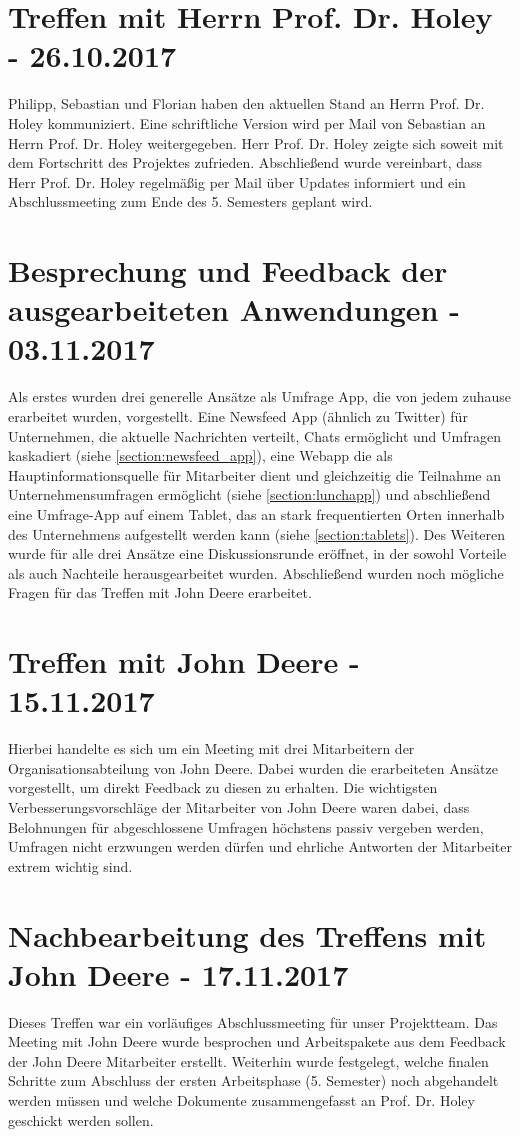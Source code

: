 \section{Treffen mit Herrn Prof. Dr. Holey - 26.10.2017}
Philipp, Sebastian und Florian haben den aktuellen Stand an Herrn Prof. Dr. Holey kommuniziert. Eine schriftliche Version wird per Mail von Sebastian an Herrn Prof. Dr. Holey weitergegeben. Herr Prof. Dr. Holey zeigte sich soweit mit dem Fortschritt des Projektes zufrieden. Abschließend wurde vereinbart, dass Herr Prof. Dr. Holey regelmäßig per Mail über Updates informiert und ein Abschlussmeeting zum Ende des 5. Semesters geplant wird.

\section{Besprechung und Feedback der ausgearbeiteten Anwendungen - 03.11.2017}
Als erstes wurden drei generelle Ansätze als Umfrage App, die von jedem zuhause erarbeitet wurden, vorgestellt. Eine Newsfeed App (ähnlich zu Twitter) für Unternehmen, die aktuelle Nachrichten verteilt, Chats ermöglicht und Umfragen kaskadiert (siehe \vref{section:newsfeed_app}), eine Webapp die als Hauptinformationsquelle für Mitarbeiter dient und gleichzeitig die Teilnahme an Unternehmensumfragen ermöglicht (siehe \vref{section:lunchapp}) und abschließend eine Umfrage-App auf einem Tablet, das an stark frequentierten Orten innerhalb des Unternehmens aufgestellt werden kann (siehe \vref{section:tablets}). Des Weiteren wurde für alle drei Ansätze eine Diskussionsrunde eröffnet, in der sowohl Vorteile als auch Nachteile herausgearbeitet wurden. Abschließend wurden noch mögliche Fragen für das Treffen mit John Deere erarbeitet.

\section{Treffen mit John Deere - 15.11.2017}
Hierbei handelte es sich um ein Meeting mit drei Mitarbeitern der Organisationsabteilung von John Deere. Dabei wurden die erarbeiteten Ansätze vorgestellt, um direkt Feedback zu diesen zu erhalten. Die wichtigsten Verbesserungsvorschläge der Mitarbeiter von John Deere waren dabei, dass Belohnungen für abgeschlossene Umfragen höchstens passiv vergeben werden, Umfragen nicht erzwungen werden dürfen und ehrliche Antworten der Mitarbeiter extrem wichtig sind.

\section{Nachbearbeitung des Treffens mit John Deere - 17.11.2017}
Dieses Treffen war ein vorläufiges Abschlussmeeting für unser Projektteam. Das Meeting mit John Deere wurde besprochen und Arbeitspakete aus dem Feedback der John Deere Mitarbeiter erstellt. Weiterhin wurde festgelegt, welche finalen Schritte zum Abschluss der ersten Arbeitsphase (5. Semester) noch abgehandelt werden müssen und welche Dokumente zusammengefasst an Prof. Dr. Holey geschickt werden sollen.

